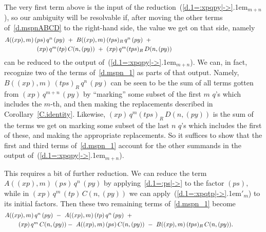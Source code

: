 \documentclass{amsart}
\begin{document}
The very first term above is the input of the
reduction~({{\setlength{\mathsurround}{0em}\ref{d.1=:xpqpy|->}\kern.1em$_{{m+n}}$}}), so our ambiguity will be resolvable
if, after moving the other terms
of~\eqref{d.mspnABCD} to the right-hand side,
the value we get on that side, namely
\begin{equation}\begin{minipage}[c]{35pc}\label{d.mspn_1}
$A((xp),m)\,(ps)\,q^n\,(py)\ +\ B((xp),m)\,(tps)_R\,q^n\,(py)\ +\\[.3em]
\hspace*{5em}(xp)\,q^m (tp)\,C(n,(py))\ +\ (xp)\,q^m (tps)_R\,D(n,(py))$
\end{minipage}\end{equation}
can be reduced to the output of~({{\setlength{\mathsurround}{0em}\ref{d.1=:xpqpy|->}\kern.1em$_{{m+n}}$}}).
We can, in fact, recognize two of the
terms of~\eqref{d.mspn_1} as parts of that output.
Namely, $B((xp),m)\,(tps)_R\,q^n\,(py)$ can be seen to be
the sum of all terms gotten from $(xp)\,q^{m+n}\,(py)$
by ``marking'' some subset of the first $m$ $\!q\!$'s
which includes the $\!m\!$-th, and then making the replacements
described in Corollary~\ref{C.identity}.
Likewise, $(xp)\,q^m (tps)_R\,D(n,(py))$ is the sum of the terms
we get on marking some subset of the last $n$ $\!q\!$'s
which includes the first of these, and making the
appropriate replacements.
So it suffices to show that the first and
third terms of~\eqref{d.mspn_1}
account for the other summands in the output of~({{\setlength{\mathsurround}{0em}\ref{d.1=:xpqpy|->}\kern.1em$_{{m+n}}$}}).

This requires a bit of further reduction.
We can reduce the term $A((xp),m)\,(ps)\,q^n\,(py)$ by
applying~\eqref{d.1=:ps|->} to the factor $(ps),$
while in $(xp)\,q^m\,(tp)\,C(n,(py))$ we can apply~({{\setlength{\mathsurround}{0em}\ref{d.1=:xpqtp|->}\kern.1em$'_{{m}}$}})
to its initial factors.
Then these two remaining terms of~\eqref{d.mspn_1} become
\begin{equation}\begin{minipage}[c]{35pc}\label{d.mspn_2}
$A((xp),m)\,q^n\,(py)\ -\ A((xp),m)\,(tp)\,q^n\,(py)\ +\\[.3em]
\hspace*{2em}(xp)\,q^m\,C(n,(py))
-\ A((xp),m)\,(ps)\,C(n,(py))\ -\ B((xp),m)\,(tps)_R\,C(n,(py)).$
\end{minipage}\end{equation}
\end{document}
